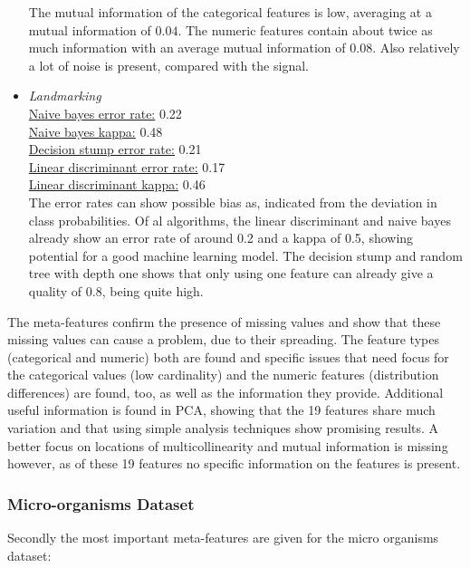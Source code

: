 \documentclass[10pt,a4paper]{article}
\begin{document}
\begin{itemize}
		 The mutual information of the categorical features is low, averaging at a mutual information of $0.04$. The numeric features contain about twice as much information with an average mutual information of $0.08$. Also relatively a lot of noise is present, compared with the signal. 
		
		\item \textit{Landmarking} \\
		\underline{Naive bayes error rate:} 0.22 \\
		\underline{Naive bayes kappa:} 0.48 \\
		\underline{Decision stump error rate:} 0.21 \\
		\underline{Linear discriminant error rate:} 0.17 \\
		\underline{Linear discriminant kappa:} 0.46 \\  
		
		The error rates can show possible bias as, indicated from the deviation in class probabilities. Of al algorithms, the linear discriminant and naive bayes already show an error rate of around 0.2 and a kappa of 0.5, showing potential for a good machine learning model. The decision stump and random tree with depth one shows that only using one feature can already give a quality of 0.8, being quite high.
	\end{itemize}

	The meta-features confirm the presence of missing values and show that these missing values can cause a problem, due to their spreading. The feature types (categorical and numeric) both are found and specific issues that need focus for the categorical values (low cardinality) and the numeric features (distribution differences) are found, too, as well as the information they provide. Additional useful information is found in PCA, showing that the 19 features share much variation and that using simple analysis techniques show promising results. A better focus on locations of multicollinearity and mutual information is missing however, as of these 19 features no specific information on the features is present.
	
	\subsubsection{Micro-organisms Dataset}
	\label{subsec:ExistingResultMO}
	
	Secondly the most important meta-features are given for the micro organisms dataset:
	
\end{document}
